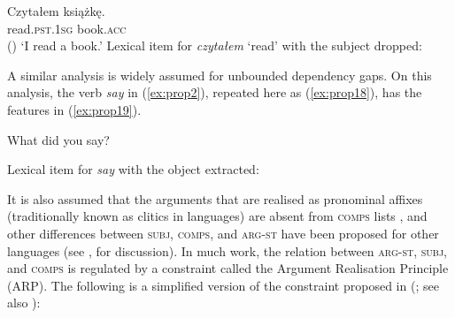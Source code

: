 \documentclass[output=paper,biblatex,babelshorthands,newtxmath,draftmode,colorlinks,citecolor=brown]{langscibook}
\begin{document}
\ea\label{ex:prop16}
\gll Czytałem książkę.\\
read.\textsc{pst.1sg} book.\textsc{acc}\\\hfill()
\glt `I read a book.'
\z
\ea\label{ex:prop17}
Lexical item for \emph{czytałem} `read' with the subject dropped:\\
\z

\noindent
A similar analysis is widely assumed for unbounded dependency gaps. On this analysis, the verb \emph{say} in (\ref{ex:prop2}), repeated here as (\ref{ex:prop18}), has the features in (\ref{ex:prop19}).

\ea\label{ex:prop18}
What did you say?

\ex\label{ex:prop19}
Lexical item for \emph{say} with the object extracted:\\
\z

\noindent
It is also assumed that the arguments that are realised as pronominal affixes (traditionally known
as clitics in  languages) are absent from \textsc{comps} lists
\parencites[Section~3]{MS97a-u}{monachesi05},
and other differences between \textsc{subj}, \textsc{comps}, and \textsc{arg-st} have been
proposed for other languages (see \citealt{MS99a},
 for
discussion). In much work, the relation between \textsc{arg-st}, \textsc{subj}, and \textsc{comps}
is regulated by a constraint called the Argument Realisation Principle (ARP).\label{page-argument-realization-principle} The following is a simplified
version of the constraint proposed in \citeauthor{GSag2000a-u} (\citeyear[171]{GSag2000a-u}; see also \citealt[12]{BMS2001a}): 

\ea\label{ex:prop20}\label{properties:ex-ARP}
 \impl
{}
\z
\end{document}
